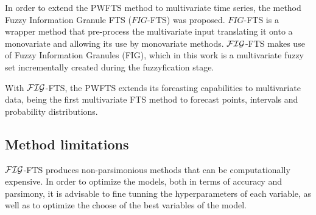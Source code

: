 In order to extend the PWFTS method to multivariate time series, the method Fuzzy Information Granule FTS ($FIG$-FTS) was proposed. $FIG$-FTS is a wrapper method that pre-process the multivariate input translating it onto a monovariate and allowing its use by monovariate methods. $\mathcal{FIG}$-FTS makes use of Fuzzy Information Granules (FIG), which in this work is a multivariate fuzzy set incrementally created during the fuzzyfication stage.

With $\mathcal{FIG}$-FTS, the PWFTS extends its foreasting capabilities to multivariate data, being the first multivariate FTS method to forecast points, intervals and probability distributions. 

\subsection{Method limitations}

$\mathcal{FIG}$-FTS produces non-parsimonious methods that can be computationally expensive. In order to optimize the models, both in terms of accuracy and parsimony, it is advisable to fine tunning the hyperparameters of each variable, as well as to optimize the choose of the best variables of the model.